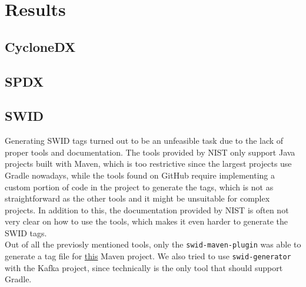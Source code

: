 \section{Results} \label{results}

\subsection{CycloneDX} \label{results:cdx}

\subsection{SPDX} \label{results:spdx}

\subsection{SWID} \label{results:swid}
Generating SWID tags turned out to be an unfeasible task due to the lack of proper tools and documentation. The tools provided by NIST only support Java projects built with Maven, which is too restrictive since the largest projects use Gradle nowadays, while the tools found on GitHub require implementing a custom portion of code in the project to generate the tags, which is not as straightforward as the other tools and it might be unsuitable for complex projects.
In addition to this, the documentation provided by NIST is often not very clear on how to use the tools, which makes it even harder to generate the SWID tags.
\\Out of all the previosly mentioned tools, only the \verb|swid-maven-plugin| was able to generate a tag file for \href{https://github.com/MithunTechnologiesDevOps/maven-web-application}{this} Maven project.
We also tried to use \verb|swid-generator| with the Kafka project, since technically is the only tool that should support Gradle. 